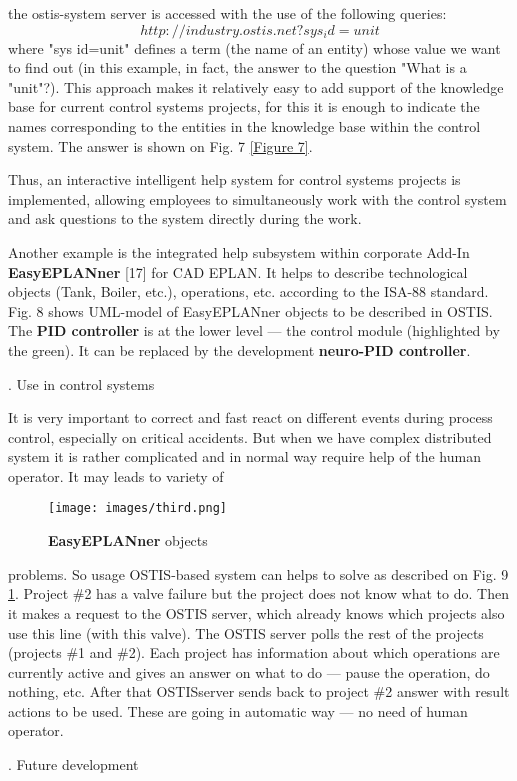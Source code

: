 \documentclass[twocolumn]{scndocument}
\begin{document}
the ostis-system server is accessed with the use of the
following queries:
\textit{$$h t t p : / / i n d u s t r y . o s t i s . n e t ? s y s _ i d = u n i t$$}
where "sys id=unit" defines a term (the name of an
entity) whose value we want to find out (in this example,
in fact, the answer to the question "What is a "unit"?).
This approach makes it relatively easy to add support of
the knowledge base for current control systems projects,
for this it is enough to indicate the names corresponding
to the entities in the knowledge base within the control
system. The answer is shown on Fig. 7 \ref{Figure 7}.

Thus, an interactive intelligent help system for control
systems projects is implemented, allowing employees to
simultaneously work with the control system and ask
questions to the system directly during the work.

Another example is the integrated help subsystem
within corporate Add-In \textbf{EasyEPLANner} [17] for CAD
EPLAN. It helps to describe technological objects (Tank,
Boiler, etc.), operations, etc. according to the ISA-88
standard. Fig. 8 shows UML-model of EasyEPLANner
objects to be described in OSTIS. The \textbf{PID controller}
is at the lower level — the control module (highlighted
by the green). It can be replaced by the development
\textbf{neuro-PID controller}.

 \begin{center}
\MakeUppercase{}. Use in control systems
\end{center}

It is very important to correct and fast react on
different events during process control, especially on
critical accidents. But when we have complex distributed
system it is rather complicated and in normal way require
help of the human operator. It may leads to variety of
\newpage

\begin{figure}[h]
    \centering
    \texttt{[image: images/third.png]}
    \caption{\textbf{EasyEPLANner} objects}
    \label{Figure 9}
\end{figure}
problems. So usage OSTIS-based system can helps to
solve as described on Fig. 9 \ref{Figure 9}. Project \#2 has a valve failure
but the project does not know what to do. Then it makes a
request to the OSTIS server, which already knows which
projects also use this line (with this valve). The OSTIS
server polls the rest of the projects (projects \#1 and \#2).
Each project has information about which operations are
currently active and gives an answer on what to do —
pause the operation, do nothing, etc. After that OSTISserver sends back to project \#2 answer with result actions
to be used. These are going in automatic way — no need
of human operator.
\begin{center}
  \MakeUppercase{}. Future development
\end{center}
\end{document}
